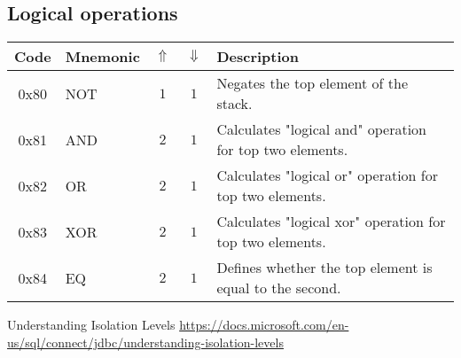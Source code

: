 \documentclass[12pt,a4paper]{article}
\begin{document}
\subsection{Logical operations}
\begin{tabularx}{\textwidth}{ c l c c p{7cm} }
\textbf{Code} & \textbf{Mnemonic} & \textbf{$\Uparrow$} & \textbf{$\Downarrow$} & \textbf{Description} \\
\hline
0x80 & NOT & $1$ & $1$ & Negates the top element of the stack. \\
\hline
0x81 & AND & $2$ & $1$ & Calculates "logical and" operation for top two elements. \\
\hline
0x82 & OR & $2$ & $1$ & Calculates "logical or" operation for top two elements. \\
\hline
0x83 & XOR & $2$ & $1$ & Calculates "logical xor" operation for top two elements. \\
\hline
0x84 & EQ & $2$ & $1$ & Defines whether the top element is equal to the second. \\
\hline

\end{tabularx}


\begin{thebibliography}{9}

 Understanding Isolation Levels \url{https://docs.microsoft.com/en-us/sql/connect/jdbc/understanding-isolation-levels}
\end{thebibliography}
\end{document}
